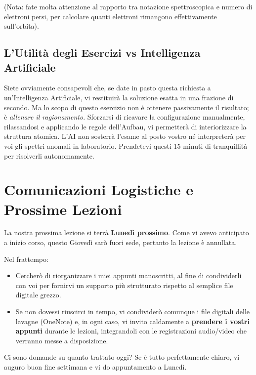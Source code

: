 (Nota: fate molta attenzione al rapporto tra notazione spettroscopica e numero di elettroni persi, per calcolare quanti elettroni rimangono effettivamente sull'orbita).

\subsection{L'Utilità degli Esercizi vs Intelligenza Artificiale}

Siete ovviamente consapevoli che, se date in pasto questa richiesta a un'Intelligenza Artificiale, vi restituirà la soluzione esatta in una frazione di secondo. Ma lo scopo di questo esercizio non è ottenere passivamente il risultato; è \textit{allenare il ragionamento}. Sforzarsi di ricavare la configurazione manualmente, rilassandosi e applicando le regole dell'Aufbau, vi permetterà di interiorizzare la struttura atomica. L'AI non sosterrà l'esame al posto vostro né interpreterà per voi gli spettri anomali in laboratorio. Prendetevi questi 15 minuti di tranquillità per risolverli autonomamente.

\section{Comunicazioni Logistiche e Prossime Lezioni}

La nostra prossima lezione si terrà \textbf{Lunedì prossimo}. Come vi avevo anticipato a inizio corso, questo Giovedì sarò fuori sede, pertanto la lezione è annullata.

Nel frattempo:
\begin{itemize}
\item Cercherò di riorganizzare i miei appunti manoscritti, al fine di condividerli con voi per fornirvi un supporto più strutturato rispetto al semplice file digitale grezzo.
\item Se non dovessi riuscirci in tempo, vi condividerò comunque i file digitali delle lavagne (OneNote) e, in ogni caso, vi invito caldamente a \textbf{prendere i vostri appunti} durante le lezioni, integrandoli con le registrazioni audio/video che verranno messe a disposizione.
\end{itemize}

Ci sono domande su quanto trattato oggi?
Se è tutto perfettamente chiaro, vi auguro buon fine settimana e vi do appuntamento a Lunedì.